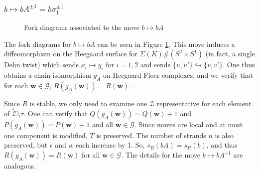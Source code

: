 \documentclass[11pt]{article}
\theoremstyle{plain} \newtheorem{thm}{Theorem}[subsection]
\theoremstyle{plain} \newtheorem{cor}[thm]{Corollary}
\theoremstyle{plain} \newtheorem{prop}[thm]{Proposition}
\theoremstyle{plain} \newtheorem{conj}[thm]{Conjecture}
\theoremstyle{plain} \newtheorem{lem}[thm]{Lemma}
\theoremstyle{definition} \newtheorem{df}[thm]{Definition}
\theoremstyle{remark} \newtheorem{rmk}[thm]{Remark}
\theoremstyle{remark} \newtheorem{obs}[thm]{Observation}
\newcommand{\DBCs}[1]{\Sigma(#1)\#(S^{2}\times S^{1})}
\newcommand{\Ztil}{\tld{\mathcal{Z}}}
\newcommand{\Zcal}{\mathcal{Z}}
\newcommand{\G}{\mathcal{G}}
\newcommand{\tld}[1]{\widetilde{#1}}
\newcommand{\bw}{\mathbf{w}}
\begin{document}
\subsubsection{$b \mapsto b A^{\pm1} = b \sigma_{1}^{\pm1}$}\label{subsec:move1}

\begin{figure}[h]
\centering
\qquad
{}
\caption{Fork diagrams associated to the move $b \mapsto b A $ \label{fig:move1}}
\end{figure}

The fork diagrams for $b \mapsto b A $ can be seen in Figure \ref{fig:move1}.  This move induces a diffeomorphism on the Heegaard surface for $\DBCs{K}$ (in fact, a single Dehn twist) which sends $x_{i} \mapsto y_{i}$ for $i = 1,2$ and sends $\{ u, u'\} \hookrightarrow \{ v,v' \}$.  One thus obtains a chain isomorphism $g_{A}$ on Heegaard Floer complexes, and we verify that for each $\bw \in \G$, $R(g_{A}(\bw)) = R(\bw)$.

Since $R$ is stable, we only need to examine one $\Zcal$ representative for each element of $\Ztil \setminus \tau$.  One can verify that $Q(g_{A}(\bw)) = Q(\bw)+1$ and $P(g_{A}(\bw)) =  P(\bw) + 1$ and all $\bw \in \G$.  Since moves are local and at most one component is modified, $T$ is preserved.  The number of strands $n$ is also preserved, but $\epsilon$ and $w$ each increase by 1.  So, $s_{R}(b A) = s_{R}(b)$, and thus $R(g_{A}(\bw)) = R(\bw)$ for all $\bw \in \G$.  The details for the move $b \mapsto b A^{-1}$ are analogous.
\end{document}
